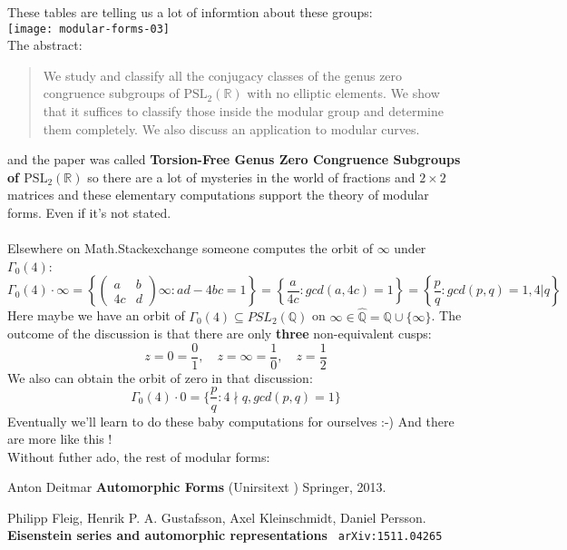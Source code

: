 \documentclass[12pt]{article}
\begin{document}
\noindent These tables are telling us a lot of informtion about these groups: \\
\texttt{[image: modular-forms-03]} \\
The abstract:
\begin{quotation} \noindent
We study and classify all the conjugacy classes of the genus zero congruence subgroups
of $\text{PSL}_2(\mathbb{R})$ with no elliptic elements. We show that it suffices to classify those
inside the modular group and determine them completely. We also discuss an application
to modular curves. \end{quotation}
and the paper was called \textbf{Torsion-Free Genus Zero Congruence Subgroups of $\text{PSL}_2(\mathbb{R})$} so there are a lot of mysteries in the world of fractions and $2 \times 2$ matrices and these elementary computations support the theory of modular forms.  Even if it's not stated. \\ \\
Elsewhere on Math.Stackexchange someone computes the orbit of $\infty$ under $\Gamma_0(4)$:
$$\Gamma_0(4)\cdot\infty = \left\{\left( \begin{array}{cc}
a & b \\
4c & d \end{array} \right)\infty : ad - 4bc = 1 \right\}
 =  \left\{\frac{a}{4c} : gcd(a,4c) = 1 \right\} 
 =  \left\{\frac{p}{q} : gcd(p, q) = 1, 4|q \right\}$$
Here maybe we have an orbit of $\Gamma_0(4) \subseteq PSL_2(\mathbb{Q})$ on $\infty \in \widehat{\mathbb{Q}} = \mathbb{Q} \cup \{ \infty \}$. The outcome of the discussion is that there are only \textbf{three} non-equivalent cusps:
$$ z = 0 = \frac{0}{1},\quad z = \infty = \frac{1}{0},\quad z = \frac{1}{2} $$
We also can obtain the orbit of zero in that discussion:
$$\Gamma_0(4)\cdot0 = \{\frac{p}{q}: 4\nmid q, gcd(p,q) = 1\}$$
Eventually we'll learn to do these baby computations for ourselves :-) And there are more like this ! \\
Without futher ado, the rest of modular forms:

\vfill

\begin{thebibliography}{}

\item Anton Deitmar \textbf{Automorphic Forms} (Unirsitext ) Springer, 2013.

\item Philipp Fleig, Henrik P. A. Gustafsson, Axel Kleinschmidt, Daniel Persson. \textbf{Eisenstein series and automorphic representations} \texttt{ arXiv:1511.04265}

\end{thebibliography}
\end{document}
